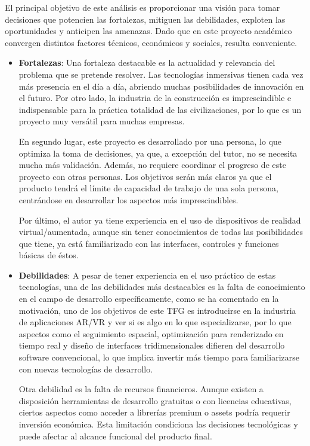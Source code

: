     El principal objetivo de este análisis es proporcionar una visión para tomar decisiones que potencien las fortalezas, mitiguen las debilidades, exploten las oportunidades y anticipen las amenazas. Dado que en este proyecto académico convergen distintos factores técnicos, económicos y sociales, resulta conveniente.
\begin{itemize}
\item \textbf{Fortalezas}: Una fortaleza destacable es la actualidad y relevancia del problema que se pretende resolver. Las tecnologías inmersivas tienen cada vez más presencia en el día a día, abriendo muchas posibilidades de innovación en el futuro. Por otro lado, la industria de la construcción es imprescindible e indispensable para la práctica totalidad de las civilizaciones, por lo que es un proyecto muy versátil para muchas empresas.

En segundo lugar, este proyecto es desarrollado por una persona, lo que optimiza la toma de decisiones, ya que, a excepción del tutor, no se necesita mucha más validación. Además, no requiere coordinar el progreso de este proyecto con otras personas. Los objetivos serán más claros ya que el producto tendrá el límite de capacidad de trabajo de una sola persona, centrándose en desarrollar los aspectos más imprescindibles.

Por último, el autor ya tiene experiencia en el uso de dispositivos de realidad virtual/aumentada, aunque sin tener conocimientos de todas las posibilidades que tiene, ya está familiarizado con las interfaces, controles y funciones básicas de éstos.

\item \textbf{Debilidades}: A pesar de tener experiencia en el uso práctico de estas tecnologías, una de las debilidades más destacables es la falta de conocimiento en el campo de desarrollo específicamente, como se ha comentado en la motivación, uno de los objetivos de este TFG es introducirse en la industria de aplicaciones AR/VR y ver si es algo en lo que especializarse, por lo que aspectos como el seguimiento espacial, optimización para renderizado en tiempo real y diseño de interfaces tridimensionales difieren del desarrollo software convencional, lo que implica invertir más tiempo para familiarizarse con nuevas tecnologías de desarrollo.

Otra debilidad es la falta de recursos financieros. Aunque existen a disposición herramientas de desarrollo gratuitas o con licencias educativas, ciertos aspectos como acceder a librerías premium o assets podría requerir inversión económica. Esta limitación condiciona las decisiones tecnológicas y puede afectar al alcance funcional del producto final.


\end{itemize}
